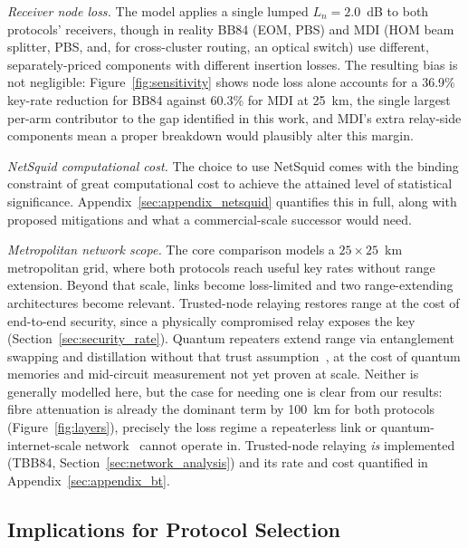 \documentclass[12pt]{article}
\begin{document}
\textit{Receiver node loss.} The model applies a single lumped $L_n=2.0$~dB to both protocols' receivers, though in reality BB84 (EOM, PBS) and MDI (HOM beam splitter, PBS, and, for cross-cluster routing, an optical switch) use different, separately-priced components with different insertion losses. The resulting bias is not negligible: Figure~\ref{fig:sensitivity} shows node loss alone accounts for a 36.9\% key-rate reduction for BB84 against 60.3\% for MDI at 25~km, the single largest per-arm contributor to the gap identified in this work, and MDI's extra relay-side components mean a proper breakdown would plausibly alter this margin.

\textit{NetSquid computational cost.} The choice to use NetSquid comes with the binding constraint of great computational cost to achieve the attained level of statistical significance. Appendix~\ref{sec:appendix_netsquid} quantifies this in full, along with proposed mitigations and what a commercial-scale successor would need.

\textit{Metropolitan network scope.} The core comparison models a $25\times25$~km metropolitan grid, where both protocols reach useful key rates without range extension. Beyond that scale, links become loss-limited and two range-extending architectures become relevant. Trusted-node relaying restores range at the cost of end-to-end security, since a physically compromised relay exposes the key (Section~\ref{sec:security_rate}). Quantum repeaters extend range via entanglement swapping and distillation without that trust assumption~\cite{Briegel_1998, Azuma_2015}, at the cost of quantum memories and mid-circuit measurement not yet proven at scale. Neither is generally modelled here, but the case for needing one is clear from our results: fibre attenuation is already the dominant term by 100~km for both protocols (Figure~\ref{fig:layers}), precisely the loss regime a repeaterless link or quantum-internet-scale network~\cite{Kimble_2008} cannot operate in. Trusted-node relaying \emph{is} implemented (TBB84, Section~\ref{sec:network_analysis}) and its rate and cost quantified in Appendix~\ref{sec:appendix_bt}.

\subsection{Implications for Protocol Selection}
\end{document}
